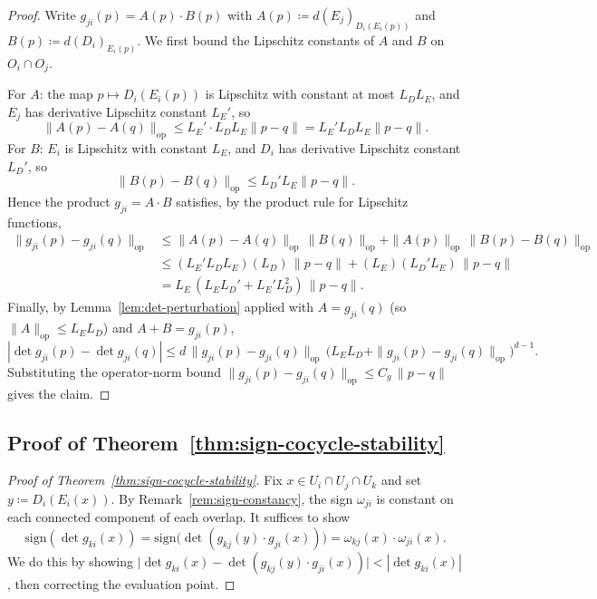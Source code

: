 \documentclass[11pt]{article}
\newcommand{\sign}{\mathrm{sign}}
\theoremstyle{plain}
\theoremstyle{definition}
\theoremstyle{remark}
\begin{document}
\begin{appendices}
\begin{proof}
Write $g_{ji}(p) = A(p) \cdot B(p)$ with $A(p) \coloneqq d(E_j)_{D_i(E_i(p))}$ and $B(p) \coloneqq d(D_i)_{E_i(p)}$. We first bound the Lipschitz constants of $A$ and $B$ on $O_i \cap O_j$.

For $A$: the map $p \mapsto D_i(E_i(p))$ is Lipschitz with constant at most $L_D L_E$, and $E_j$ has derivative Lipschitz constant $L_E'$, so
\[
\|A(p) - A(q)\|_{\mathrm{op}} \leq L_E' \cdot L_D L_E \|p - q\| = L_E' L_D L_E \|p - q\|.
\]
For $B$: $E_i$ is Lipschitz with constant $L_E$, and $D_i$ has derivative Lipschitz constant $L_D'$, so
\[
\|B(p) - B(q)\|_{\mathrm{op}} \leq L_D' L_E \|p - q\|.
\]
Hence the product $g_{ji} = A \cdot B$ satisfies, by the product rule for Lipschitz functions,
\begin{align*}
\|g_{ji}(p) - g_{ji}(q)\|_{\mathrm{op}}
&\leq \|A(p) - A(q)\|_{\mathrm{op}}\, \|B(q)\|_{\mathrm{op}} + \|A(p)\|_{\mathrm{op}}\, \|B(p) - B(q)\|_{\mathrm{op}} \\
&\leq (L_E' L_D L_E)(L_D)\,\|p - q\| + (L_E)(L_D' L_E)\,\|p - q\| \\
&= L_E\,(L_E L_D' + L_E' L_D^2)\,\|p - q\|.
\end{align*}
Finally, by Lemma~\ref{lem:det-perturbation} applied with $A = g_{ji}(q)$ (so $\|A\|_{\mathrm{op}} \leq L_E L_D$) and $A + B = g_{ji}(p)$,
\[
|\det g_{ji}(p) - \det g_{ji}(q)|
\leq d\,\|g_{ji}(p) - g_{ji}(q)\|_{\mathrm{op}}\,
\bigl(L_E L_D + \|g_{ji}(p) - g_{ji}(q)\|_{\mathrm{op}}\bigr)^{d-1}.
\]
Substituting the operator-norm bound $\|g_{ji}(p) - g_{ji}(q)\|_{\mathrm{op}} \leq C_g\,\|p-q\|$ gives the claim. \qedhere
\end{proof}

\subsection{Proof of Theorem~\ref{thm:sign-cocycle-stability}}\label{proof:sign-cocycle-stability}

\begin{proof}[Proof of Theorem~\ref{thm:sign-cocycle-stability}]
Fix $x \in U_i \cap U_j \cap U_k$ and set $y \coloneqq D_i(E_i(x))$. By Remark~\ref{rem:sign-constancy}, the sign $\omega_{ji}$ is constant on each connected component of each overlap. It suffices to show
\[
\sign(\det g_{ki}(x)) = \sign\bigl(\det(g_{kj}(y) \cdot g_{ji}(x))\bigr) = \omega_{kj}(x) \cdot \omega_{ji}(x).
\]
We do this by showing $\bigl|\det g_{ki}(x) - \det(g_{kj}(y) \cdot g_{ji}(x))\bigr| < |\det g_{ki}(x)|$, then correcting the evaluation point.


\end{proof}
\end{appendices}
\end{document}
